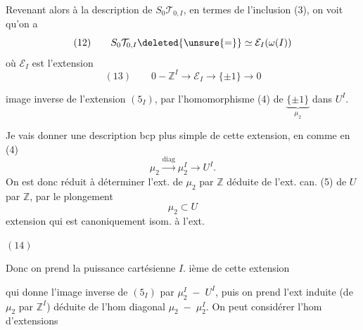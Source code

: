 Revenant alors à la description de $S_0\mathcal T_{0,I}$, en termes de l'inclusion (3), on voit qu'on a
\[
(12)\qquad S_0\mathcal T_{0,I}\deleted{\unsure{=}}\simeq\mathcal E_I(\omega(I))
\]
où $\mathcal E_I$ est l'extension
\[
(13)\qquad0-\mathbb Z^I\longrightarrow\mathcal E_I\longrightarrow\{\pm1\}\longrightarrow0
\]

image inverse de l'extension $(5_I)$, par l'homomorphisme (4) de $\underbrace{\{\pm1\}}_{\mu_2}$ dans $U^I$.

Je vais donner une description bcp plus simple de cette extension, en  comme en (4)
\[
\mu_2\xrightarrow{\mathrm{diag}}\mu_2^I\longrightarrow U^I.
\]
On est donc réduit à déterminer l'ext. de $\mu_2$ par $\mathbb Z$ déduite de l'ext. can. (5) de $U$ par $\mathbb Z$, par le plongement
\[
\mu_2\subset U
\]
extension qui est canoniquement isom. à l'ext. 

$(14)$\quad
{}

Donc on prend la puissance cartésienne $I$. ième de cette extension


qui donne l'image inverse de $(5_I)$ par $\mu_2^I\;-\;U^I$, puis on prend l'ext induite (de $\mu_2$ par $\mathbb Z^I$) déduite de l'hom diagonal $\mu_2\;-\;\mu_2^I$. On peut considérer l'hom d'extensions


